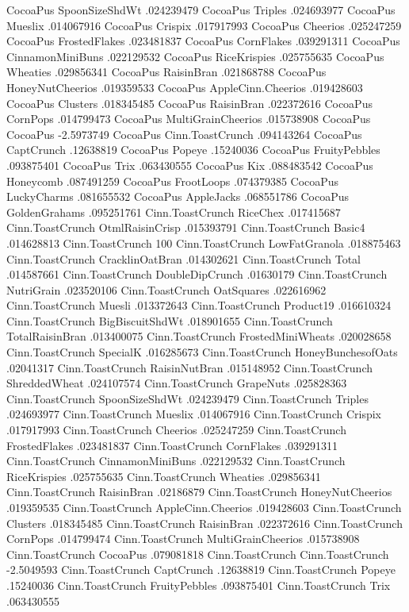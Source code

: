 CocoaPus	SpoonSizeShdWt	.024239479
CocoaPus	Triples	.024693977
CocoaPus	Mueslix	.014067916
CocoaPus	Crispix	.017917993
CocoaPus	Cheerios	.025247259
CocoaPus	FrostedFlakes	.023481837
CocoaPus	CornFlakes	.039291311
CocoaPus	CinnamonMiniBuns	.022129532
CocoaPus	RiceKrispies	.025755635
CocoaPus	Wheaties	.029856341
CocoaPus	RaisinBran	.021868788
CocoaPus	HoneyNutCheerios	.019359533
CocoaPus	AppleCinn.Cheerios	.019428603
CocoaPus	Clusters	.018345485
CocoaPus	RaisinBran	.022372616
CocoaPus	CornPops	.014799473
CocoaPus	MultiGrainCheerios	.015738908
CocoaPus	CocoaPus	-2.5973749
CocoaPus	Cinn.ToastCrunch	.094143264
CocoaPus	CaptCrunch	.12638819
CocoaPus	Popeye	.15240036
CocoaPus	FruityPebbles	.093875401
CocoaPus	Trix	.063430555
CocoaPus	Kix	.088483542
CocoaPus	Honeycomb	.087491259
CocoaPus	FrootLoops	.074379385
CocoaPus	LuckyCharms	.081655532
CocoaPus	AppleJacks	.068551786
CocoaPus	GoldenGrahams	.095251761
Cinn.ToastCrunch	RiceChex	.017415687
Cinn.ToastCrunch	OtmlRaisinCrisp	.015393791
Cinn.ToastCrunch	Basic4	.014628813
Cinn.ToastCrunch	100%
Cinn.ToastCrunch	LowFatGranola	.018875463
Cinn.ToastCrunch	CracklinOatBran	.014302621
Cinn.ToastCrunch	Total	.014587661
Cinn.ToastCrunch	DoubleDipCrunch	.01630179
Cinn.ToastCrunch	NutriGrain	.023520106
Cinn.ToastCrunch	OatSquares	.022616962
Cinn.ToastCrunch	Muesli	.013372643
Cinn.ToastCrunch	Product19	.016610324
Cinn.ToastCrunch	BigBiscuitShdWt	.018901655
Cinn.ToastCrunch	TotalRaisinBran	.013400075
Cinn.ToastCrunch	FrostedMiniWheats	.020028658
Cinn.ToastCrunch	SpecialK	.016285673
Cinn.ToastCrunch	HoneyBunchesofOats	.02041317
Cinn.ToastCrunch	RaisinNutBran	.015148952
Cinn.ToastCrunch	ShreddedWheat	.024107574
Cinn.ToastCrunch	GrapeNuts	.025828363
Cinn.ToastCrunch	SpoonSizeShdWt	.024239479
Cinn.ToastCrunch	Triples	.024693977
Cinn.ToastCrunch	Mueslix	.014067916
Cinn.ToastCrunch	Crispix	.017917993
Cinn.ToastCrunch	Cheerios	.025247259
Cinn.ToastCrunch	FrostedFlakes	.023481837
Cinn.ToastCrunch	CornFlakes	.039291311
Cinn.ToastCrunch	CinnamonMiniBuns	.022129532
Cinn.ToastCrunch	RiceKrispies	.025755635
Cinn.ToastCrunch	Wheaties	.029856341
Cinn.ToastCrunch	RaisinBran	.02186879
Cinn.ToastCrunch	HoneyNutCheerios	.019359535
Cinn.ToastCrunch	AppleCinn.Cheerios	.019428603
Cinn.ToastCrunch	Clusters	.018345485
Cinn.ToastCrunch	RaisinBran	.022372616
Cinn.ToastCrunch	CornPops	.014799474
Cinn.ToastCrunch	MultiGrainCheerios	.015738908
Cinn.ToastCrunch	CocoaPus	.079081818
Cinn.ToastCrunch	Cinn.ToastCrunch	-2.5049593
Cinn.ToastCrunch	CaptCrunch	.12638819
Cinn.ToastCrunch	Popeye	.15240036
Cinn.ToastCrunch	FruityPebbles	.093875401
Cinn.ToastCrunch	Trix	.063430555
